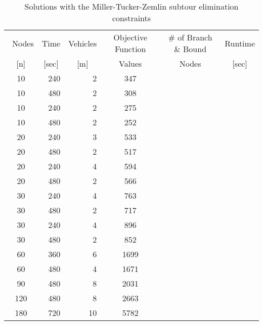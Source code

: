 \documentclass[a4paper]{article}
\begin{document}
\begin{table}[h!]
	\centering
	\caption{Solutions with the Miller-Tucker-Zemlin subtour elimination constraints}
		\begin{tabular}{|c|r|r||c|c|c|}
			\hline\
		Nodes & Time & Vehicles	& Objective Function & \# of Branch \& Bound & Runtime\\
   		\multicolumn{1}{|c|}{[n]} & \multicolumn{1}{c|}{[sec]} & \multicolumn{1}{c||}{[m]} & \multicolumn{1}{c|}{Values} & \multicolumn{1}{c|}{Nodes} & \multicolumn{1}{c|}{[sec]} \\
			\hline 
				10	&	240	&	2	&	347		&		&		\\
				10	&	480	&	2	&	308		&		&		\\
				10	&	240	&	2	&	275		&		&		\\
				10	&	480	&	2	&	252		&		&		\\
				20	&	240	&	3	&	533		&		&		\\
				20	&	480	&	2	&	517		&		&		\\
				20	&	240	&	4	&	594		&		&		\\
				20	&	480	&	2	&	566		&		&		\\
				30	&	240	&	4	&	763		&		&		\\
				30	&	480	&	2	&	717		&		&		\\
				30	&	240	&	4	&	896		&		&		\\
				30	&	480	&	2	&	852		&		&		\\
				60	&	360	&	6	&	1699	&		&		\\
				60	&	480	&	4	&	1671	&		&		\\
				90	&	480	&	8	&	2031	&		&		\\
				120	&	480	&	8	&	2663	&		&		\\
				180	&	720	&	10	&	5782	&		&		\\
				
			\hline 
		\end{tabular}
	\label{tab:scf}
\end{table}

 	     	
\end{document}
